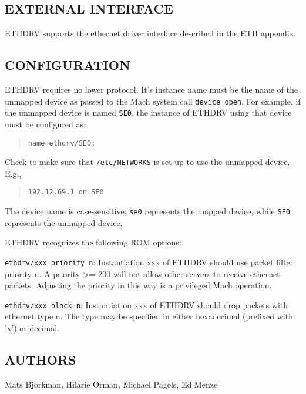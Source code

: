 \subsection*{EXTERNAL INTERFACE}

ETHDRV supports the ethernet driver interface
described in the ETH appendix.


\subsection*{CONFIGURATION}

ETHDRV requires no lower protocol.  It's instance name
must be the name of the unmapped device as passed to the Mach system call
{\tt device\_open}.  For example, if the unmapped device is named 
{\tt SE0}, the instance of ETHDRV using that device must be configured
as: 

\begin{quote}
{\tt name=ethdrv/SE0;}
\end{quote}

\noindent
Check to make sure that {\tt /etc/NETWORKS} is set up to use the
unmapped device.  E.g.,

\begin{quote}
{\tt 192.12.69.1 on SE0 }
\end{quote}

\noindent
The device name is case-sensitive; {\tt se0} represents the mapped device,
while {\tt SE0} represents the unmapped device.

\medskip

\noindent
ETHDRV recognizes the following ROM options:

\smallskip

{\tt ethdrv/xxx priority n}:
Instantiation xxx of ETHDRV should use packet filter priority n.  
A priority >= 200 will not allow other servers to receive ethernet
packets.   Adjusting the priority in this way is a privileged
Mach operation. 

\medskip

{\tt ethdrv/xxx block n}:
Instantiation xxx of ETHDRV should drop packets with ethernet type
n.  The type may be specified in either hexadecimal (prefixed with
'x') or decimal.


\subsection*{AUTHORS}

\noindent Mats Bjorkman, Hilarie Orman, Michael Pagels, Ed Menze

